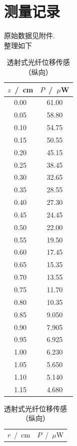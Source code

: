 \documentclass[a4paper]{article}%
\begin{document}
\section{测量记录}
原始数据见附件.\\整理如下
\begin{table}[H]
  \begin{minipage}{0.2\linewidth}
      \centering
      \begin{tabular}{cc}
          \toprule
          $z$~/~cm & $P$~/~$\mu$W\\
          \midrule
          0.00	&	61.00	\\
          0.05	&	58.80	\\
          0.10	&	54.75	\\
          0.15	&	50.55	\\
          0.20	&	45.15	\\
          0.25	&	38.45	\\
          0.30	&	32.65	\\
          0.35	&	28.55	\\
          0.40	&	27.30	\\
          0.45	&	24.45	\\
          0.50	&	22.00	\\
          0.55	&	19.50	\\
          0.60	&	17.45	\\
          0.65	&	15.35	\\
          0.70	&	13.55	\\
          0.75	&	11.70	\\
          0.80	&	10.35	\\
          0.85	&	9.050 	\\
          0.90	&	7.905 	\\
          0.95	&	6.925 	\\
          1.00	&	6.230 	\\
          1.05	&	5.650 	\\
          1.10	&	5.140 	\\
          1.15	&	4.680 	\\
          \bottomrule
      \end{tabular}
      \caption{透射式光纤位移传感（纵向）}\label{001}
  \end{minipage}
  \begin{minipage}{0.29\linewidth}  
      \centering
      \begin{tabular}{cc} 
          \toprule
          $r$~/~cm & $P$~/~$\mu$W \\

\end{tabular}
\end{minipage}
\end{table}
\end{document}
